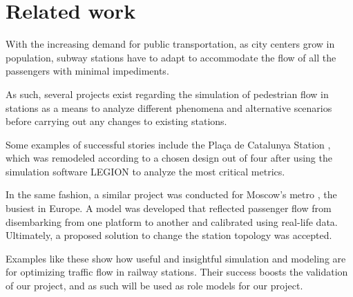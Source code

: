 \section{Related work} \label{sec:related_work}

With the increasing demand for public transportation, as city centers grow in population, subway stations have to adapt to accommodate the flow of all the passengers with minimal impediments.

As such, several projects exist regarding the simulation of pedestrian flow in stations as a means to analyze different phenomena and alternative scenarios before carrying out any changes to existing stations.

Some examples of successful stories include the Plaça de Catalunya Station \cite{catalunya}, which was remodeled according to a chosen design out of four after using the simulation software LEGION to analyze the most critical metrics. 

In the same fashion, a similar project was conducted for Moscow's metro \cite{moscow}, the busiest in Europe. A model was developed that reflected passenger flow from disembarking from one platform to another and calibrated using real-life data. Ultimately, a proposed solution to change the station topology was accepted.

Examples like these show how useful and insightful simulation and modeling are for optimizing traffic flow in railway stations. Their success boosts the validation of our project, and as such will be used as role models for our project.